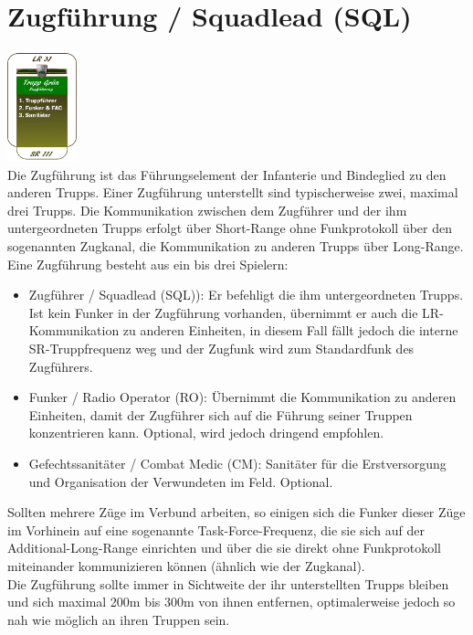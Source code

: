 \section{Zugführung / Squadlead (SQL)}
\includegraphics[width=20mm]{./img/truppenordnung/zugfuehrung/zugfuehrung.png}\\
Die Zugführung ist das Führungselement der Infanterie und Bindeglied zu den anderen Trupps. Einer Zugführung unterstellt sind typischerweise zwei, maximal drei Trupps. Die Kommunikation zwischen dem Zugführer und der ihm untergeordneten Trupps erfolgt über Short-Range ohne Funkprotokoll über den sogenannten Zugkanal, die Kommunikation zu anderen Trupps über Long-Range.\\
Eine Zugführung besteht aus ein bis drei Spielern:
\begin{itemize}
	\item Zugführer / Squadlead (SQL)): Er befehligt die ihm untergeordneten Trupps. Ist kein Funker in der Zugführung vorhanden, übernimmt er auch die LR-Kommunikation zu anderen Einheiten, in diesem Fall fällt jedoch die interne SR-Truppfrequenz weg und der Zugfunk wird zum Standardfunk des Zugführers.
	\item Funker / Radio Operator (RO): Übernimmt die Kommunikation zu anderen Einheiten, damit der Zugführer sich auf die Führung seiner Truppen konzentrieren kann. Optional, wird jedoch dringend empfohlen.
	\item Gefechtssanitäter / Combat Medic (CM): Sanitäter für die Erstversorgung und Organisation der Verwundeten im Feld. Optional.
\end{itemize}
Sollten mehrere Züge im Verbund arbeiten, so einigen sich die Funker dieser Züge im Vorhinein auf eine sogenannte Task-Force-Frequenz, die sie sich auf der Additional-Long-Range einrichten und über die sie direkt ohne Funkprotokoll miteinander kommunizieren können (ähnlich wie der Zugkanal).\\
Die Zugführung sollte immer in Sichtweite der ihr unterstellten Trupps bleiben und sich maximal 200m bis 300m von ihnen entfernen, optimalerweise jedoch so nah wie möglich an ihren Truppen sein.